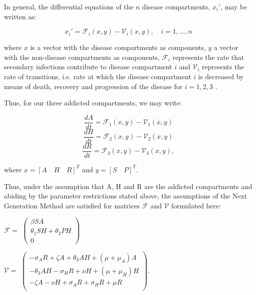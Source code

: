 \documentclass[12pt]{article}
\begin{document}
In general, the differential equations of the $n$ disease compartments, $x_i'$, may be written as: 

\[{x_i'} = \mathscr{F}_{i} (x,y)-\mathscr{V}_i (x,y),\quad i=1,...,n\] 

where $x$ is a vector with the disease compartments as components, $y$ a vector with the non-disease compartments as components, $\mathscr{F}_{i}$ represents the rate that secondary infections contribute to disease compartment $i$ and $\mathscr{V}_{i}$ represents the rate of transitions, i.e. rate at which the disease compartment $i$ is decreased by means of death, recovery and progression of the disease for $i=1,2,3$ \cite{Driessche}. 

Thus, for our three addicted compartments, we may write: 

$$\dfrac{dA}{dt} = \mathscr{F}_{1} (x,y)-\mathscr{V}_{1}(x,y)$$
$$\dfrac{dH}{dt} = \mathscr{F}_{2} (x,y)-\mathscr{V}_{2}(x,y)$$
$$\dfrac{dR}{dt} = \mathscr{F}_{3} (x,y)-\mathscr{V}_{3}(x,y),$$

where $x= {[A\quad H\quad R]}^{T}$ and $y= {[S\quad P]}^{T}$.



Thus, under the assumption that A, H and R are the addicted compartments and abiding by the parameter restrictions stated above, the assumptions of the Next Generation Method are satisfied for matrices $\mathscr{F}$ and $\mathscr{V}$ formulated here:

\begin{center}
$\mathscr{F}=$
$ \begin{pmatrix}

\beta SA \\
\theta_{1}SH+\theta_{2}PH \\
0
\end{pmatrix}$



$\mathscr{V}=$
$ \begin{pmatrix}

-\sigma_{A}R+\zeta A+\theta_{3} AH + (\mu +\mu_{A})A \\
-\theta_{3}AH-\sigma_{H}R+\nu H +(\mu +\mu_{H}) H \\
-\zeta A -\nu H +\sigma_{A}R +\sigma_{H}R +\mu R\\
\end{pmatrix}$.
\end{center}
\end{document}
